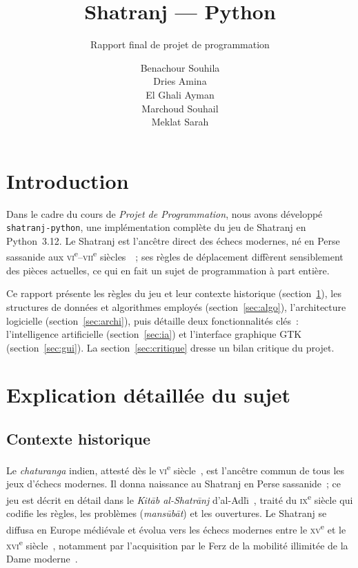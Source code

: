 \documentclass[a4paper,11pt]{article}
\title{Shatranj --- Python}
\subtitle{Rapport final de projet de programmation}
\author{Benachour Souhila \\ Dries Amina \\ El Ghali Ayman \\ Marchoud Souhail \\ Meklat Sarah}
\begin{document}
\maketitle
\thispagestyle{empty}

\section*{Introduction}

Dans le cadre du cours de \emph{Projet de Programmation}, nous avons développé
\texttt{shatranj-python}, une implémentation complète du jeu de Shatranj en
Python~3.12. Le Shatranj est l'ancêtre direct des échecs modernes, né en Perse
sassanide aux \textsc{vi}\textsuperscript{e}--\textsc{vii}\textsuperscript{e}
siècles~\cite{Murray1913}~; ses règles de déplacement diffèrent sensiblement
des pièces actuelles, ce qui en fait un sujet de programmation à part entière.

Ce rapport présente les règles du jeu et leur contexte historique
(section~\ref{sec:regles}), les structures de données et algorithmes employés
(section~\ref{sec:algo}), l'architecture logicielle (section~\ref{sec:archi}),
puis détaille deux fonctionnalités clés~: l'intelligence artificielle
(section~\ref{sec:ia}) et l'interface graphique GTK (section~\ref{sec:gui}).
La section~\ref{sec:critique} dresse un bilan critique du projet.

\section{Explication détaillée du sujet}
\label{sec:regles}

\subsection{Contexte historique}

Le \emph{chaturanga} indien, attesté dès le \textsc{vi}\textsuperscript{e}
siècle~\cite{Murray1913}, est l'ancêtre commun de tous les jeux d'échecs
modernes. Il donna naissance au Shatranj en Perse sassanide~; ce jeu est
décrit en détail dans le \emph{Kit\=ab al-Shatr\=anj} d'al-Adl\={\i}~\cite{Murray1913},
traité du \textsc{ix}\textsuperscript{e} siècle qui codifie les règles, les
problèmes (\emph{mans\=ub\=at}) et les ouvertures. Le Shatranj se diffusa en
Europe médiévale et évolua vers les échecs modernes entre le
\textsc{xv}\textsuperscript{e} et le \textsc{xvi}\textsuperscript{e}
siècle~\cite{Shenk2006,Davidson1949}, notamment par l'acquisition par le Ferz
de la mobilité illimitée de la Dame moderne~\cite{Davidson1949}.
\end{document}
